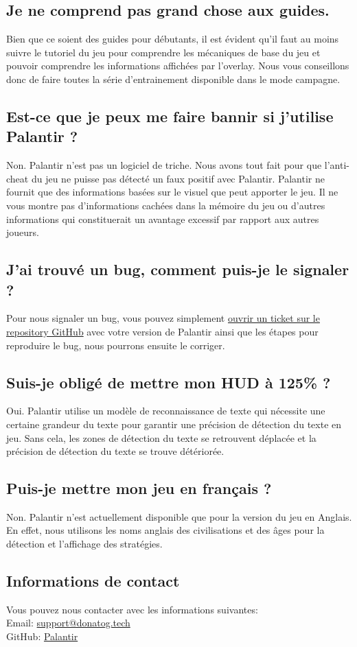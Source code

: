 \subsection{Je ne comprend pas grand chose aux guides.}
Bien que ce soient des guides pour débutants, il est évident qu'il faut au moins suivre le tutoriel du jeu pour comprendre les mécaniques de base du jeu et pouvoir comprendre les informations affichées par l'overlay. Nous vous conseillons donc de faire toutes la série d'entrainement disponible dans le mode campagne.

\subsection{Est-ce que je peux me faire bannir si j'utilise Palantir ?}
Non. Palantir n'est pas un logiciel de triche. Nous avons tout fait pour que l'anti-cheat du jeu ne puisse pas détecté un faux positif avec Palantir. Palantir ne fournit que des informations basées sur le visuel que peut apporter le jeu. Il ne vous montre pas d'informations cachées dans la mémoire du jeu ou d'autres informations qui constituerait un avantage excessif par rapport aux autres joueurs.

\subsection{J'ai trouvé un bug, comment puis-je le signaler ?}
Pour nous signaler un bug, vous pouvez simplement \href{https://github.com/UNamurCSFaculty/2223_INFOB318_Palantir/issues}{ouvrir un ticket sur le repository GitHub} avec votre version de Palantir ainsi que les étapes pour reproduire le bug, nous pourrons ensuite le corriger.

\subsection{Suis-je obligé de mettre mon HUD à 125\% ?}
Oui. Palantir utilise un modèle de reconnaissance de texte qui nécessite une certaine grandeur du texte pour garantir une précision de détection du texte en jeu. Sans cela, les zones de détection du texte se retrouvent déplacée et la précision de détection du texte se trouve détériorée.

\subsection{Puis-je mettre mon jeu en français ?}
Non. Palantir n'est actuellement disponible que pour la version du jeu en Anglais. En effet, nous utilisons les noms anglais des civilisations et des âges pour la détection et l'affichage des stratégies.

\subsection{Informations de contact}
Vous pouvez nous contacter avec les informations suivantes:\\

Email: \href{mailto:support@donatog.tech}{support@donatog.tech}\\
GitHub: \href{https://github.com/UNamurCSFaculty/2223_INFOB318_Palantir}{Palantir}\\